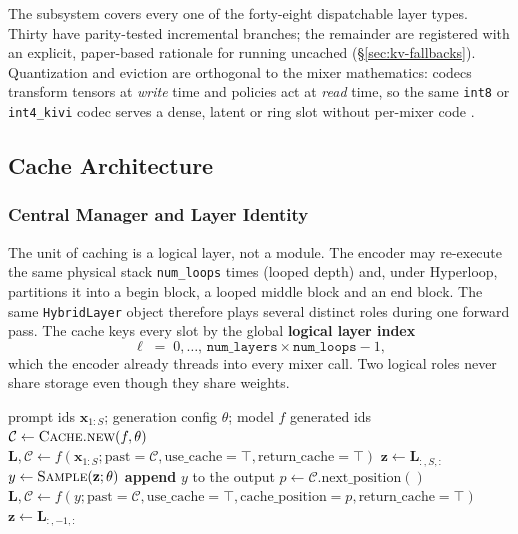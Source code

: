 The subsystem covers every one of the forty-eight dispatchable layer types. Thirty have parity-tested incremental branches; the remainder are registered with an explicit, paper-based rationale for running uncached (\S\ref{sec:kv-fallbacks}). Quantization and eviction are orthogonal to the mixer mathematics: codecs transform tensors at \emph{write} time and policies act at \emph{read} time, so the same \texttt{int8} or \texttt{int4\_kivi} codec serves a dense, latent or ring slot without per-mixer code \citep{kivi_liu_2024,kvquant_hooper_2024,skvq_duanmu_2024}.

\subsection{Cache Architecture}
\label{sec:kv-architecture}

\subsubsection{Central Manager and Layer Identity}

The unit of caching is a logical layer, not a module. The encoder may re-execute the same physical stack \texttt{num\_loops} times (looped depth) and, under Hyperloop, partitions it into a begin block, a looped middle block and an end block. The same \texttt{HybridLayer} object therefore plays several distinct roles during one forward pass. The cache keys every slot by the global \textbf{logical layer index}
\[
\ell \;=\; 0,\dots,\, \texttt{num\_layers}\times\texttt{num\_loops}-1 ,
\]
which the encoder already threads into every mixer call. Two logical roles never share storage even though they share weights.

\begin{algorithm}[H]
\caption{Cached generation loop (prefill + decode)}
\begin{algorithmic}[1]
\Require prompt ids $\mathbf{x}_{1:S}$; generation config $\theta$; model $f$
\Ensure generated ids
\State $\mathcal{C} \gets \textsc{Cache.new}(f,\theta)$ 
\State $\mathbf{L}, \mathcal{C} \gets f(\mathbf{x}_{1:S}; \text{past}=\mathcal{C}, \text{use\_cache}=\top, \text{return\_cache}=\top)$ 
\State $\mathbf{z} \gets \mathbf{L}_{:,S,:}$
    \State $y \gets \textsc{Sample}(\mathbf{z};\theta)$ 
    \State \textbf{append} $y$ to the output
        \State $p \gets \mathcal{C}.\text{next\_position}()$
        \State $\mathbf{L}, \mathcal{C} \gets f(y; \text{past}=\mathcal{C}, \text{use\_cache}=\top, \text{cache\_position}=p, \text{return\_cache}=\top)$
        \State $\mathbf{z} \gets \mathbf{L}_{:,-1,:}$
    \EndIf
\EndFor
\end{algorithmic}
\end{algorithm}

